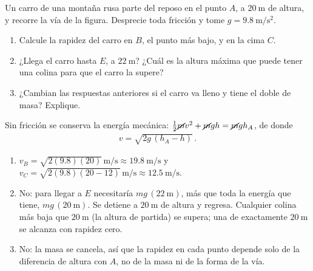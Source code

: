 \documentclass[12pt, a4paper]{article}
\begin{document}
\begin{exercise}[ID=montana, tags={parcial2}, points=17, nuevapagina=true]
Un carro de una montaña rusa parte del reposo en el punto $A$, a $\qty{20}{\m}$ de altura, y recorre la vía de la figura. Desprecie toda fricción y tome $g=\qty{9.8}{\m/\s^2}$.

\begin{center}
\end{center}

\begin{enumerate}
    \item Calcule la rapidez del carro en $B$, el punto más bajo, y en la cima $C$.
    \item ¿Llega el carro hasta $E$, a $\qty{22}{\m}$? ¿Cuál es la altura máxima que puede tener una colina para que el carro la supere?
    \item ¿Cambian las respuestas anteriores si el carro va lleno y tiene el doble de masa? Explique.
\end{enumerate}
\end{exercise}
\begin{solution}
Sin fricción se conserva la energía mecánica: $\frac{1}{2}\cancel{m}v^2+\cancel{m}gh=\cancel{m}gh_A$, de donde
\begin{align}
    v=\sqrt{2g\,(h_A-h)}\,.
\end{align}
\begin{enumerate}
    \item $v_B=\sqrt{2(9.8)(20)}\,\unit{\m/\s}\approx\qty{19.8}{\m/\s}$ y $v_C=\sqrt{2(9.8)(20-12)}\,\unit{\m/\s}\approx\qty{12.5}{\m/\s}$.
    \item No: para llegar a $E$ necesitaría $mg\,(\qty{22}{\m})$, más que toda la energía que tiene, $mg\,(\qty{20}{\m})$. Se detiene a $\qty{20}{\m}$ de altura y regresa. Cualquier colina más baja que $\qty{20}{\m}$ (la altura de partida) se supera; una de exactamente $\qty{20}{\m}$ se alcanza con rapidez cero.
    \item No: la masa se cancela, así que la rapidez en cada punto depende solo de la diferencia de altura con $A$, no de la masa ni de la forma de la vía.
\end{enumerate}
\end{solution}
\end{document}
